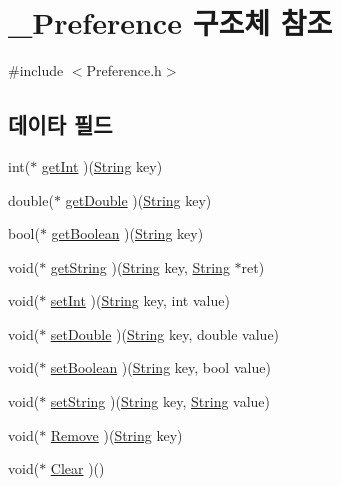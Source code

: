 \hypertarget{struct___preference}{\section{\-\_\-\-Preference 구조체 참조}
\label{struct___preference}
}


{\ttfamily \#include $<$Preference.\-h$>$}

\subsection*{데이타 필드}
\begin{DoxyCompactItemize}
\item 
int($\ast$ \hyperlink{struct___preference_ade99d80ce928102448db06db94ab9f92}{get\-Int} )(\hyperlink{dit_8h_a2efe6d463d80744789f228f5dc4baa39}{String} key)
\item 
double($\ast$ \hyperlink{struct___preference_afe52eabc9bccdfbb596972f7ea486ead}{get\-Double} )(\hyperlink{dit_8h_a2efe6d463d80744789f228f5dc4baa39}{String} key)
\item 
bool($\ast$ \hyperlink{struct___preference_a4be87827f55abdbd3012520159040082}{get\-Boolean} )(\hyperlink{dit_8h_a2efe6d463d80744789f228f5dc4baa39}{String} key)
\item 
void($\ast$ \hyperlink{struct___preference_adb1c477dbd0c3e00ee2ba27168145ac1}{get\-String} )(\hyperlink{dit_8h_a2efe6d463d80744789f228f5dc4baa39}{String} key, \hyperlink{dit_8h_a2efe6d463d80744789f228f5dc4baa39}{String} $\ast$ret)
\item 
void($\ast$ \hyperlink{struct___preference_aa764bbce5aed489d6d513185620475e3}{set\-Int} )(\hyperlink{dit_8h_a2efe6d463d80744789f228f5dc4baa39}{String} key, int value)
\item 
void($\ast$ \hyperlink{struct___preference_a254206bd3d65b6005aa12230f4297321}{set\-Double} )(\hyperlink{dit_8h_a2efe6d463d80744789f228f5dc4baa39}{String} key, double value)
\item 
void($\ast$ \hyperlink{struct___preference_a7a60c27995791a32705d277621ce9d4b}{set\-Boolean} )(\hyperlink{dit_8h_a2efe6d463d80744789f228f5dc4baa39}{String} key, bool value)
\item 
void($\ast$ \hyperlink{struct___preference_a0335e1a950110bafc47fab3849396e74}{set\-String} )(\hyperlink{dit_8h_a2efe6d463d80744789f228f5dc4baa39}{String} key, \hyperlink{dit_8h_a2efe6d463d80744789f228f5dc4baa39}{String} value)
\item 
void($\ast$ \hyperlink{struct___preference_a90568077b029ed3e0b1602de2448ace5}{Remove} )(\hyperlink{dit_8h_a2efe6d463d80744789f228f5dc4baa39}{String} key)
\item 
void($\ast$ \hyperlink{struct___preference_a38ab41f7f71a3a7e6ae756e158bb812c}{Clear} )()
\end{DoxyCompactItemize}


